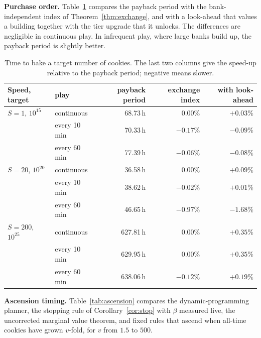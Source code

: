 \documentclass[11pt,a4paper]{article}
\numberwithin{equation}{section}
\theoremstyle{definition}
\theoremstyle{remark}
\newcommand{\proofstep}[1]{\par\addvspace{\medskipamount}\noindent\textbf{#1}\enspace\ignorespaces}
\begin{document}
\proofstep{Purchase order.} Table~\ref{tab:purchase} compares the payback period with the bank-independent index of Theorem~\ref{thm:exchange}, and with a look-ahead that values a building together with the tier upgrade that it unlocks. The differences are negligible in continuous play. In infrequent play, where large banks build up, the payback period is slightly better.

\begin{table}[t]
\centering
\small
\begin{tabular}{@{}llrrr@{}}
\toprule
Speed, target & play & payback period & exchange index & with look-ahead \\
\midrule
$S=1$, $10^{15}$ & continuous & 68.73\,h & $0.00\%$ & $+0.03\%$ \\
 & every 10 min & 70.33\,h & $-0.17\%$ & $-0.09\%$ \\
 & every 60 min & 77.39\,h & $-0.06\%$ & $-0.08\%$ \\
$S=20$, $10^{20}$ & continuous & 36.58\,h & $0.00\%$ & $+0.09\%$ \\
 & every 10 min & 38.62\,h & $-0.02\%$ & $+0.01\%$ \\
 & every 60 min & 46.65\,h & $-0.97\%$ & $-1.68\%$ \\
$S=200$, $10^{25}$ & continuous & 627.81\,h & $0.00\%$ & $+0.35\%$ \\
 & every 10 min & 629.95\,h & $0.00\%$ & $+0.35\%$ \\
 & every 60 min & 638.06\,h & $-0.12\%$ & $+0.19\%$ \\
\bottomrule
\end{tabular}
\caption{Time to bake a target number of cookies. The last two columns give the speed-up relative to the payback period; negative means slower.}
\label{tab:purchase}
\end{table}

\proofstep{Ascension timing.} Table~\ref{tab:ascension} compares the dynamic-programming planner, the stopping rule of Corollary~\ref{cor:stop} with $\beta$ measured live, the uncorrected marginal value theorem, and fixed rules that ascend when all-time cookies have grown $v$-fold, for $v$ from $1.5$ to $500$.
\end{document}
